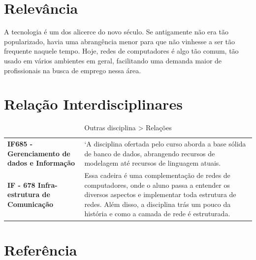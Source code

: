 \documentclass[10pt]{article}
\begin{document}
\section{Relevância}
\label{rel}
\label{dois}

A tecnologia é um dos alicerce do novo século. Se antigamente não era tão popularizado, havia uma abrangência menor para que não vinhesse a ser tão frequente naquele tempo. Hoje, redes de computadores é algo tão comum, tão usado em vários ambientes em geral, facilitando uma demanda maior de profissionais na busca de emprego nessa área.\cite{rel}\cite{dois}

\section{Relação Interdisciplinares}
\label{revinterd}
\label{tres}

\begin{table}[h]
 \centering
 {\renewcommand\arraystretch{1.25}
  \caption{Outras disciplina > Relações}
 \begin{tabular}{ l l }
  \cline{1-1}\cline{2-2}  
   
  \\  
  \cline{1-1}\cline{2-2}  
    \multicolumn{1}{|p{3.850cm}|}{\textbf{IF685 - Gerenciamento de dados e Informação}} &
    \multicolumn{1}{p{4.217cm}|}{‘A disciplina ofertada pelo curso aborda a base sólida de banco de dados, abrangendo recursos de modelagem até recursos de linguagem atuais.\cite{tres}}
  \\  
  \cline{1-1}\cline{2-2}  
    \multicolumn{1}{|p{3.850cm}|}{\textbf{IF - 678 Infra-estrutura de Comunicação}} &
    \multicolumn{1}{p{4.217cm}|}{Essa cadeira é uma complementação de redes de computadores, onde o aluno passa a entender os diversos aspectos e implementar toda estrutura de redes. Além disso, a disciplina trás um pouco da história e como a camada de rede é estruturada. \cite{revinterd}}
  \\  
  \hline

 \end{tabular} }
\end{table}

\section{Referência}


\end{document}
